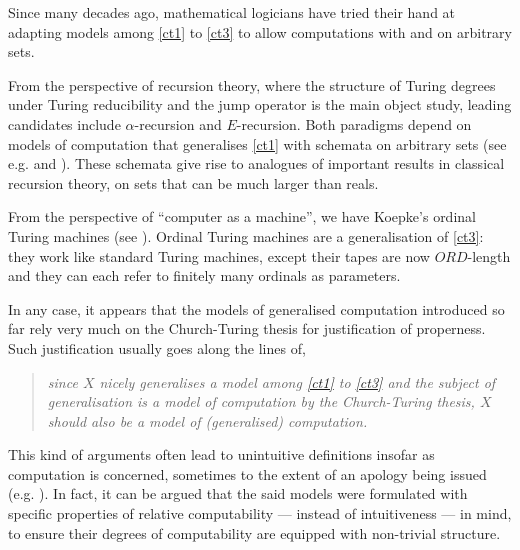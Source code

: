 \documentclass[12pt]{article}
\numberwithin{equation}{section}
\begin{document}
Since many decades ago, mathematical logicians have tried their hand at adapting models among \ref{ct1} to \ref{ct3} to allow computations with and on arbitrary sets.

From the perspective of recursion theory, where the structure of Turing degrees under Turing reducibility and the jump operator is the main object study, leading candidates include $\alpha$-recursion and $E$-recursion. Both paradigms depend on models of computation that generalises \ref{ct1} with schemata on arbitrary sets (see e.g. \cite{takeuti} and \cite{normann}). These schemata give rise to analogues of important results in classical recursion theory, on sets that can be much larger than reals. 

From the perspective of ``computer as a machine'', we have Koepke's ordinal Turing machines (see \cite{koepke1}). Ordinal Turing machines are a generalisation of \ref{ct3}: they work like standard Turing machines, except their tapes are now $ORD$-length and they can each refer to finitely many ordinals as parameters. 

In any case, it appears that the models of generalised computation introduced so far rely very much on the Church-Turing thesis for justification of properness. Such justification usually goes along the lines of,
\begin{quote}
    \emph{since $X$ nicely generalises a model among \ref{ct1} to \ref{ct3} and the subject of generalisation is a model of computation by the Church-Turing thesis, $X$ should also be a model of (generalised) computation.}
\end{quote}
This kind of arguments often lead to unintuitive definitions insofar as computation is concerned, sometimes to the extent of an apology being issued (e.g. \cite{sackserec}). In fact, it can be argued that the said models were formulated with specific properties of relative computability --- instead of intuitiveness --- in mind, to ensure their degrees of computability are equipped with non-trivial structure. 
\end{document}
